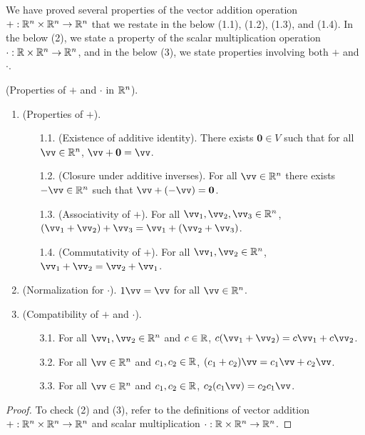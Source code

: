 We have proved several properties of the vector addition operation $+:\mathbb{R}^n \times \mathbb{R}^n \rightarrow \mathbb{R}^n$ that we restate in the below (1.1), (1.2), (1.3), and (1.4). In the below (2), we state a property of the scalar multiplication operation $\cdot:\mathbb{R} \times \mathbb{R}^n \rightarrow \mathbb{R}^n$, and in the below (3), we state properties involving both $+$ and $\cdot$.

\begin{theorem}
\label{ch::lin_alg::thm::prop_operations_Rn}
    (Properties of $+$ and $\cdot$ in $\mathbb{R}^n$).
        \begin{enumerate}
            \item (Properties of $+$).
            \begin{enumerate}
                \item[1.1.] (Existence of additive identity). There exists $\mathbf{0} \in V$ such that for all $\vv \in \R^n$, $\vv + \mathbf{0} = \vv$.
                \item[1.2.] (Closure under additive inverses). For all $\vv \in \R^n$ there exists $-\vv \in \R^n$ such that $\vv + (-\vv) = \mathbf{0}$.
                \item[1.3.] (Associativity of $+$). For all $\vv_1, \vv_2, \vv_3 \in \R^n$, $(\vv_1 + \vv_2) + \vv_3 = \vv_1 + (\vv_2 + \vv_3)$.
                \item[1.4.] (Commutativity of $+$). For all $\vv_1, \vv_2 \in \R^n$, $\vv_1 + \vv_2 = \vv_2 + \vv_1$.
            \end{enumerate}
            \item (Normalization for $\cdot$). $1 \vv = \vv$ for all $\vv \in \R^n$.
            \item (Compatibility of $+$ and $\cdot$).
            \begin{enumerate}
                \item[3.1.] For all $\vv_1, \vv_2 \in \R^n$ and $c \in \mathbb{R}$, $c(\vv_1 + \vv_2) = c \vv_1 + c \vv_2$.
                \item[3.2.] For all $\vv \in \R^n$ and $c_1, c_2 \in \mathbb{R}$, $(c_1 + c_2)\vv = c_1 \vv + c_2 \vv$.
                \item[3.3.] For all $\vv \in \R^n$ and $c_1, c_2 \in \mathbb{R}$, $c_2 (c_1 \vv) = c_2 c_1 \vv$.
            \end{enumerate}
        \end{enumerate}
\end{theorem}

\begin{proof}
   To check (2) and (3), refer to the definitions of vector addition $+:\mathbb{R}^n \times \mathbb{R}^n \rightarrow \mathbb{R}^n$ and scalar multiplication $\cdot:\mathbb{R} \times \mathbb{R}^n \rightarrow \mathbb{R}^n$.
\end{proof}

